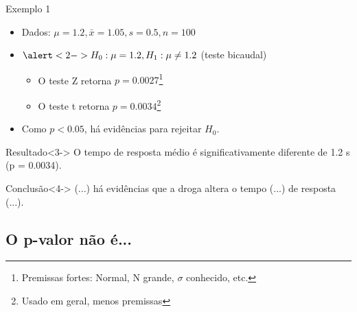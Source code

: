 \documentclass{beamer}
\begin{document}
\begin{frame}{Exemplo 1}
    \begin{itemize}
      \scriptsize
    \item Dados: $\mu = 1.2, \bar{x} = 1.05, s = 0.5, n=100$
    \item $\alert<2->{H_0: \mu = 1.2}, H_1: \mu \ne 1.2$ (teste bicaudal)
      \begin{itemize}
        \scriptsize
      \item O teste Z retorna $p = 0.0027$\footnote{Premissas fortes: Normal, N grande, $\sigma$ conhecido, etc.}
      \item O teste t retorna $p = 0.0034$\footnote{Usado em geral, menos premissas}
      \end{itemize}
    \item<2-> Como $p < 0.05$, há evidências para rejeitar \alert<2->{$H_0$}.
    \end{itemize}
  \begin{exampleblock}{Resultado}<3->
    \small
    O tempo de resposta médio é \alert{significativamente} diferente de 1.2 s ({\footnotesize p = 0.0034}).
  \end{exampleblock}
  \begin{exampleblock}{Conclusão}<4->
    \small
    (...) há evidências que a droga altera o tempo (...)  de resposta (...).
  \end{exampleblock}

\end{frame}

\subsection{O p-valor não é...}
\end{document}
